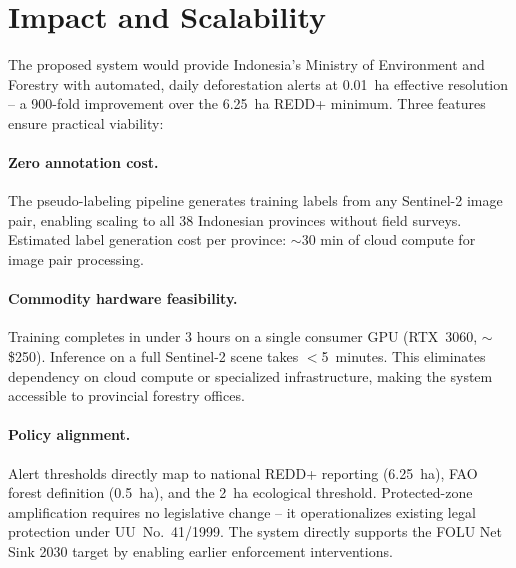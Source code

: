 \documentclass[10pt,a4paper,onecolumn]{article}
\begin{document}
\section{Impact and Scalability}
The proposed system would provide Indonesia's Ministry of
Environment and Forestry with automated, daily deforestation alerts
at 0.01~ha effective resolution -- a 900-fold improvement over the
6.25~ha REDD+ minimum. Three features ensure practical viability:

\paragraph{Zero annotation cost.}
The pseudo-labeling pipeline generates training labels from any
Sentinel-2 image pair, enabling scaling to all 38 Indonesian
provinces without field surveys. Estimated label generation cost
per province: $\sim$30 min of cloud compute for image pair
processing.

\paragraph{Commodity hardware feasibility.}
Training completes in under 3 hours on a single consumer GPU
(RTX~3060, $\sim$\$250). Inference on a full Sentinel-2 scene takes
${<}$5~minutes. This eliminates dependency on cloud compute or
specialized infrastructure, making the system accessible to
provincial forestry offices.

\paragraph{Policy alignment.}
Alert thresholds directly map to national REDD+ reporting (6.25~ha),
FAO forest definition (0.5~ha), and the 2~ha ecological threshold.
Protected-zone amplification requires no legislative change --
it operationalizes existing legal protection under UU~No.~41/1999.
The system directly supports the FOLU Net Sink 2030 target by
enabling earlier enforcement interventions.
\end{document}
